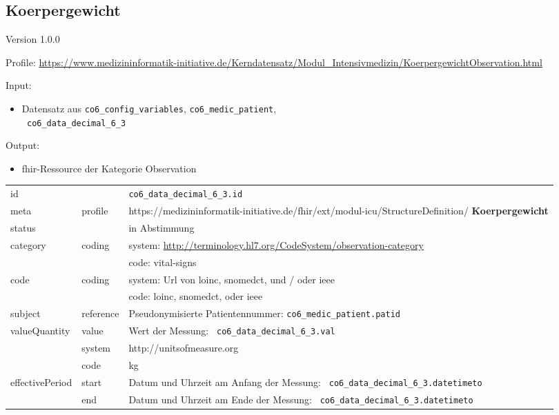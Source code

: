 \subsection{
Koerpergewicht} 
\noindent Version 1.0.0

\noindent Profile: \url{https://www.medizininformatik-initiative.de/Kerndatensatz/Modul_Intensivmedizin/KoerpergewichtObservation.html}

\noindent Input:
\begin{itemize}
	\item Datensatz aus \texttt{co6\_config\_variables}, \texttt{co6\_medic\_patient}, \\ \texttt{
co6\_data\_decimal\_6\_3}
\end{itemize}
Output:
\begin{itemize}
        \item \ac{fhir}-Ressource der Kategorie \glqq Observation\grqq{}
\end{itemize}
\begin{longtable}{|l|l|p{7.5cm}|}
        \hline
        \rowcolor{lightgray} \multicolumn{3}{|l|}{Data Mapping (inhaltlich)} \\ \hline
        id &  & \texttt{co6\_data\_decimal\_6\_3.id} \\ \hline
	meta & profile & https://medizininformatik-initiative.de/fhir/ext/modul-icu/StructureDefinition/\textbf{
Koerpergewicht} \\ \hline 
	status &  & in Abstimmung  \\ \hline 
	category & coding & system: \url{http://terminology.hl7.org/CodeSystem/observation-category} \\
\cline{3-3}
	& & code: vital-signs \\ \hline
	code & coding & system: Url von \ac{loinc}, \ac{snomedct}, und / oder \ac{ieee} \\ 
	\cline{3-3} 
	 &  & code: \ac{loinc}, \ac{snomedct}, oder \ac{ieee} \\ \hline
	subject & reference & Pseudonymisierte Patientennummer: \texttt{co6\_medic\_patient.patid} \\ \hline
	valueQuantity & value & Wert der Messung: \texttt{
co6\_data\_decimal\_6\_3.val} \\
        \cline{2-3}
         & system & http://unitsofmeasure.org \\
         \cline{2-3}
         & code & kg \\ \hline
    effectivePeriod & start & Datum und Uhrzeit am Anfang der Messung: \texttt{
co6\_data\_decimal\_6\_3.datetimeto} \\
    \cline{2-3}
     & end & Datum und Uhrzeit am Ende der Messung: \texttt{
co6\_data\_decimal\_6\_3.datetimeto} \\ \hline
\end{longtable}


